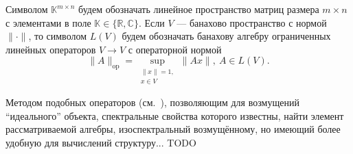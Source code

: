 Символом \( \mathbb{K}^{m\times n} \)
    будем обозначать линейное пространство
    матриц размера \( m\times n \)
    с элементами в поле \( \mathbb{K}\in\{\mathbb{R},\mathbb{C}\} \).
Если \( V \) --- банахово пространство с нормой \( \|\cdot\| \),
    то символом \( L(V) \)
    будем обозначать банахову алгебру
    ограниченных линейных операторов \( V\to V \)
    с операторной нормой
\[
    \|A\|_{\mathrm{op}} = \sup_{\substack{\|x\|=1,\\ x\in V}} \|A x\|,\ A\in L(V).
    \]


Методом подобных операторов (см.~\cite{baskakov-harmonic,baskakov1983}),
 позволяющим для возмущений ``идеального'' объекта, спектральные свойства которого известны,
 найти элемент рассматриваемой алгебры, изоспектральный возмущ\"енному,
 но имеющий более удобную для вычислений структуру...
TODO
